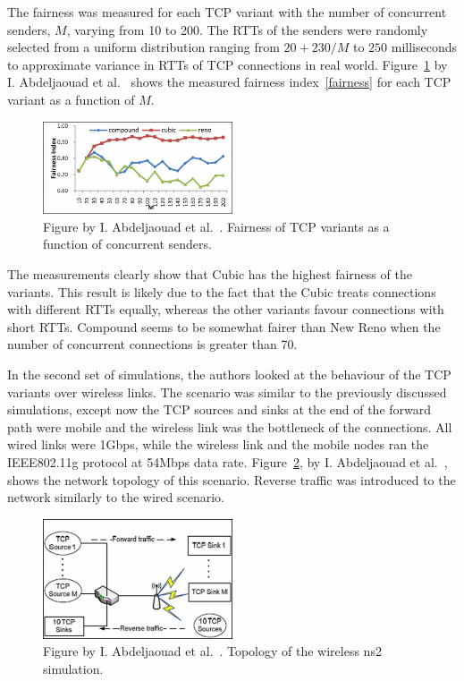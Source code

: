 The fairness was measured for each TCP variant with the number of concurrent senders, $M$, varying from 10 to 200. The RTTs of the senders were randomly selected from a uniform distribution ranging from $20 + 230/M$ to $250$ milliseconds to approximate variance in RTTs of TCP connections in real world. Figure~\ref{fig:fairness1} by I. Abdeljaouad et al.~\cite{Abdeljaouad10} shows the measured fairness index~\eqref{fairness} for each TCP variant as a function of $M$.

\begin{figure}
	\includegraphics[width=0.5\textwidth]{images/abdeljaouad10_fairness_1.png}
	\caption{Figure by I. Abdeljaouad et al.~\cite{Abdeljaouad10}. Fairness of TCP variants as a function of concurrent senders.}
	\label{fig:fairness1}
\end{figure}

The measurements clearly show that Cubic has the highest fairness of the variants. This result is likely due to the fact that the Cubic treats connections with different RTTs equally, whereas the other variants favour connections with short RTTs. Compound seems to be somewhat fairer than New Reno when the number of concurrent connections is greater than 70. 

In the second set of simulations, the authors looked at the behaviour of the TCP variants over wireless links. The scenario was similar to the previously discussed simulations, except now the TCP sources and sinks at the end of the forward path were mobile and the wireless link was the bottleneck of the connections. All wired links were 1Gbps, while the wireless link and the mobile nodes ran the IEEE802.11g protocol at 54Mbps data rate. Figure~\ref{fig:topology3}, by I. Abdeljaouad et al.~\cite{Abdeljaouad10}, shows the network topology of this scenario. Reverse traffic was introduced to the network similarly to the wired scenario.     

\begin{figure}
	\includegraphics[width=0.5\textwidth]{images/abdeljaouad10_topology_3.png}
	\caption{Figure by I. Abdeljaouad et al.~\cite{Abdeljaouad10}. Topology of the wireless ns2 simulation.}
	\label{fig:topology3}
\end{figure}

